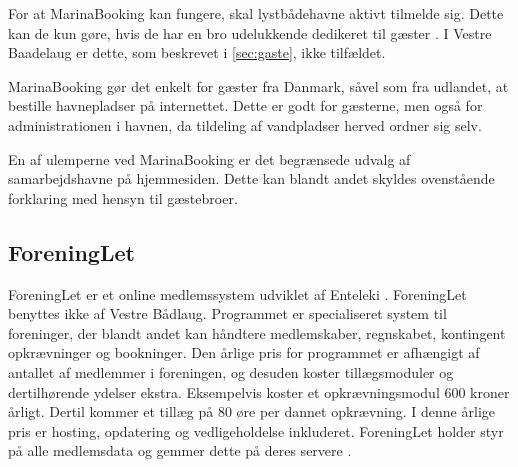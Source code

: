 For at MarinaBooking kan fungere, skal lystbådehavne aktivt tilmelde sig. Dette kan de kun gøre, hvis de har en bro udelukkende dedikeret til gæster \cite{int_vb_sl}. I Vestre Baadelaug er dette, som beskrevet i \cref{sec:gaste}, ikke tilfældet.

MarinaBooking gør det enkelt for gæster fra Danmark, såvel som fra udlandet, at bestille havnepladser på internettet. Dette er godt for gæsterne, men også for administrationen i havnen, da tildeling af vandpladser herved ordner sig selv.

En af ulemperne ved MarinaBooking er det begrænsede udvalg af samarbejdshavne på hjemmesiden. Dette kan blandt andet skyldes ovenstående forklaring med hensyn til gæstebroer.








\subsection{ForeningLet} %
\label{sub:ForeningLet}

ForeningLet er et online medlemssystem udviklet af Enteleki \cite{foreninglet}. ForeningLet benyttes ikke af Vestre Bådlaug. Programmet er specialiseret system til foreninger, der blandt andet kan håndtere medlemskaber, regnskabet, kontingent opkrævninger og bookninger. Den årlige pris for programmet er afhængigt af antallet af medlemmer i foreningen, og desuden koster tillægsmoduler og dertilhørende ydelser ekstra. Eksempelvis koster et opkrævningsmodul 600 kroner årligt. Dertil kommer et tillæg på 80 øre per dannet opkrævning. I denne årlige pris er hosting, opdatering og vedligeholdelse inkluderet. ForeningLet holder styr på alle medlemsdata og gemmer dette på deres servere \cite{foreninglet}.

